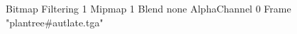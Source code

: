 {Bitmap
	{Filtering 1}
	{Mipmap 1}
	{Blend none}
	{AlphaChannel 0}
	{Frame "plantree#autlate.tga"}
}
